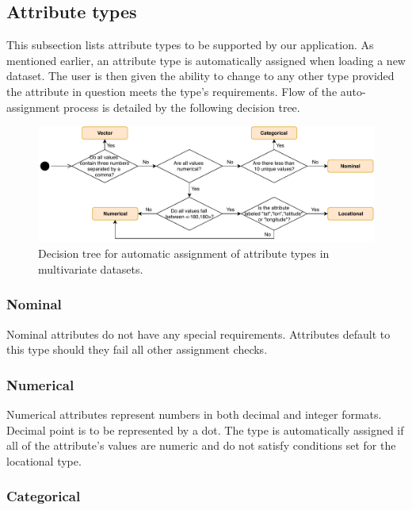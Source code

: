 \documentclass[thesis=M,english,hidelinks]{FITthesisXE}[2012/06/26]
\begin{document}
\subsection{Attribute types}

This subsection lists attribute types to be supported by our application. As mentioned earlier, an attribute type is automatically assigned when loading a new dataset. The user is then given the ability to change to any other type provided the attribute in question meets the type's requirements. Flow of the auto-assignment process is detailed by the following decision tree.

\begin{figure}[ht]
\centering
\includegraphics[scale=0.6]{attribute_assignment}
\caption{Decision tree for automatic assignment of attribute types in multivariate datasets.}
\label{fig:attribute_assignment}
\end{figure}

\newpage

\subsubsection{Nominal}

Nominal attributes do not have any special requirements. Attributes default to this type should they fail all other assignment checks.

\subsubsection{Numerical}

Numerical attributes represent numbers in both decimal and integer formats. Decimal point is to be represented by a dot. The type is automatically assigned if all of the attribute's values are numeric and do not satisfy conditions set for the locational type.

\subsubsection{Categorical}
\end{document}
